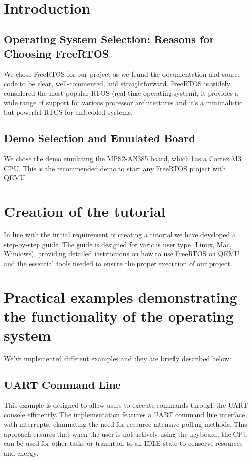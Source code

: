 \section{Introduction}

\subsection{Operating System Selection: Reasons for Choosing FreeRTOS}
We chose FreeRTOS for our project as we found the documentation and source code to be clear, well-commented, and straightforward. FreeRTOS is widely considered the most popular RTOS (real-time operating system), it provides a wide range of support for various processor architectures and it's a minimalistic but powerful RTOS for embedded systems.
\subsection{Demo Selection and Emulated Board}
We chose the demo emulating the MPS2-AN385 board, which has a Cortex M3 CPU. This is the recommended demo to start any FreeRTOS project with QEMU.


\section{Creation of the tutorial}
In line with the initial requirement of creating a tutorial we have developed a step-by-step guide. 
The guide is designed for various user type (Linux, Mac, Windows), providing detailed instructions on how to use FreeRTOS on QEMU and the essential tools needed to ensure the proper execution of our project.


\section{Practical examples demonstrating the functionality of the operating system}
We've implemented different examples and they are briefly described below:
\subsection{UART Command Line} \label{Uart Example}
This example is designed to allow users to execute commands through the UART console efficiently. 
The implementation features a UART command line interface with interrupts, eliminating the need for
resource-intensive polling methods. This approach ensures that when the user is not actively using the keyboard, the CPU can be used for
other tasks or transition to an IDLE state to conserve resources and
energy.

